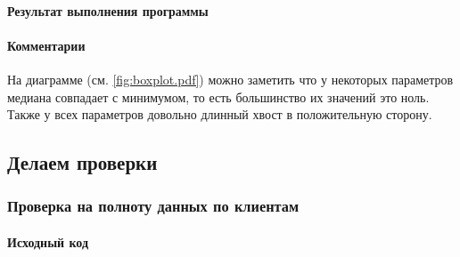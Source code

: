 \documentclass[12pt,a4paper]{article}
\begin{document}
  \paragraph*{Результат выполнения программы}

  \paragraph*{Комментарии}
  На диаграмме (см. \autoref{fig:boxplot.pdf}) можно заметить что у некоторых параметров медиана совпадает с минимумом,
  то есть большинство их значений это ноль.
  Также у всех параметров довольно длинный хвост в положительную сторону.

  \subsection{Делаем проверки}
  \subsubsection{Проверка на полноту данных по клиентам}
  \paragraph*{Исходный код}
\begin{Shaded}
\begin{Highlighting}[]
\OperatorTok{=} \NormalTok{(res1[}\NormalTok{].value\_counts())}
\OperatorTok{=} \OperatorTok{=}
\OperatorTok{=} \NormalTok{(res1[res1[}\NormalTok{] }\OperatorTok{==}\NormalTok{ amount][}\NormalTok{])}
\NormalTok{(}
\NormalTok{(}\NormalTok{, }
\end{Highlighting}
\end{Shaded}

\begin{Shaded}
\begin{Highlighting}[]
\NormalTok{(}\OperatorTok{\textasciitilde{}}\NormalTok{data[data[cols\_sparse[}\NormalTok{]].isna()][cols\_sparse].isna()).}\NormalTok{()}
\end{Highlighting}
\end{Shaded}
\end{document}
